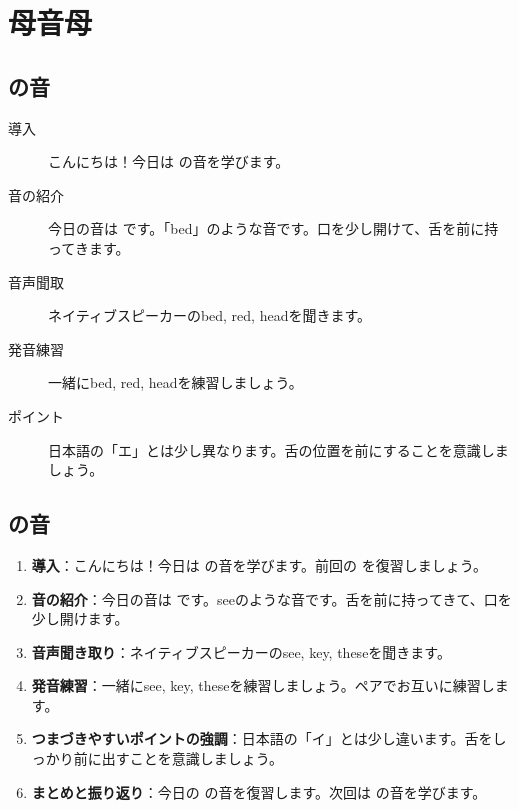 \documentclass[book,jafontscale=0.9247]{jlreq}
\begin{document}
\tableofcontents
\clearpage
\chapter{母音母}

\section{\textipa{/\textepsilon /} の音}
\begin{description}
    \item[導入]こんにちは！今日は \textipa{/\textepsilon /} の音を学びます。
    \item[音の紹介]今日の音は  です。「bed」のような音です。口を少し開けて、舌を前に持ってきます。
    \item[音声聞取]ネイティブスピーカーのbed, red, headを聞きます。
    \item[発音練習]一緒にbed, red, headを練習しましょう。
    \item[ポイント] 日本語の「エ」とは少し異なります。舌の位置を前にすることを意識しましょう。
\end{description}

\section{ の音}
\begin{enumerate}
    \item \textbf{導入}：こんにちは！今日は  の音を学びます。前回の  を復習しましょう。
    \item \textbf{音の紹介}：今日の音は  です。seeのような音です。舌を前に持ってきて、口を少し開けます。
    \item \textbf{音声聞き取り}：ネイティブスピーカーのsee, key, theseを聞きます。
    \item \textbf{発音練習}：一緒にsee, key, theseを練習しましょう。ペアでお互いに練習します。
    \item \textbf{つまづきやすいポイントの強調}：日本語の「イ」とは少し違います。舌をしっかり前に出すことを意識しましょう。
    \item \textbf{まとめと振り返り}：今日の  の音を復習します。次回は  の音を学びます。
\end{enumerate}
\end{document}
